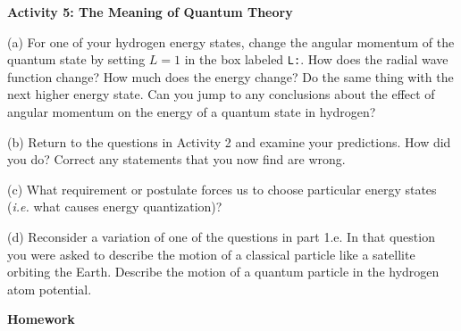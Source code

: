 \textbf{Activity 5: The Meaning of Quantum Theory}

(a) For one of your hydrogen energy states, change the angular momentum of the
quantum state by setting $L=1$ in the box labeled {\tt L:}.
How does the radial wave function change?
How much does the energy change?
Do the same thing with the next higher energy state.
Can you jump to any conclusions about the effect of angular momentum on the energy
of a quantum state in hydrogen?
\vspace{2.0cm}

(b) Return to the questions in Activity 2 and examine your predictions.
How did you do?
Correct any statements that you now find are wrong.
\vspace{2.0cm}

(c) What requirement or postulate forces us to choose particular energy states
({\it i.e.} what causes energy quantization)?
\vspace{2.0cm}

\newpage

(d) Reconsider a variation of one of the questions in part 1.e.
In that question you were asked to describe the motion of a classical particle
like a satellite orbiting the Earth.
Describe the motion of a quantum particle in the hydrogen atom potential.
\vspace{3.0cm}

\textbf{Homework}

